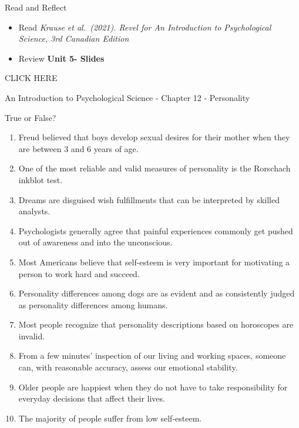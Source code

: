 \documentclass[
]{book}
\providecommand{\tightlist}{%
  \setlength{\itemsep}{0pt}\setlength{\parskip}{0pt}}
\begin{document}
\begin{reflect}
{Read and Reflect}

\begin{itemize}
\tightlist
\item
  Read \emph{Krause et al.~(2021). Revel for An Introduction to Psychological Science, 3rd Canadian Edition}\\
\item
  Review \textbf{Unit 5- Slides}
\end{itemize}

CLICK HERE

An Introduction to Psychological Science - Chapter 12 - Personality

True or False?

\begin{enumerate}
\def\labelenumi{\arabic{enumi}.}
\tightlist
\item
  Freud believed that boys develop sexual desires for their mother when they are between 3 and 6 years of age.\\
\item
  One of the most reliable and valid measures of personality is the Rorschach inkblot test.\\
\item
  Dreams are disguised wish fulfillments that can be interpreted by skilled analysts.\\
\item
  Psychologists generally agree that painful experiences commonly get pushed out of awareness and into the unconscious.\\
\item
  Most Americans believe that self-esteem is very important for motivating a person to work hard and succeed.\\
\item
  Personality differences among dogs are as evident and as consistently judged as personality differences among humans.\\
\item
  Most people recognize that personality descriptions based on horoscopes are invalid.\\
\item
  From a few minutes' inspection of our living and working spaces, someone can, with reasonable accuracy, assess our emotional stability.\\
\item
  Older people are happiest when they do not have to take responsibility for everyday decisions that affect their lives.\\
\item
  The majority of people suffer from low self-esteem.
\end{enumerate}


\end{reflect}
\end{document}
